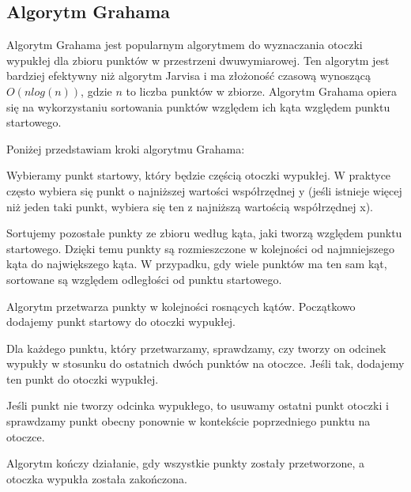 \subsection{Algorytm Grahama}

\quad Algorytm Grahama jest popularnym algorytmem do wyznaczania otoczki wypukłej dla zbioru punktów w przestrzeni dwuwymiarowej. Ten algorytm jest bardziej efektywny niż algorytm Jarvisa i ma złożoność czasową wynoszącą $O(nlog(n))$, gdzie $n$ to liczba punktów w zbiorze. Algorytm Grahama opiera się na wykorzystaniu sortowania punktów względem ich kąta względem punktu startowego.

Poniżej przedstawiam kroki algorytmu Grahama:

Wybieramy punkt startowy, który będzie częścią otoczki wypukłej. W praktyce często wybiera się punkt o najniższej wartości współrzędnej y (jeśli istnieje więcej niż jeden taki punkt, wybiera się ten z najniższą wartością współrzędnej x).

Sortujemy pozostałe punkty ze zbioru według kąta, jaki tworzą względem punktu startowego. Dzięki temu punkty są rozmieszczone w kolejności od najmniejszego kąta do największego kąta. W przypadku, gdy wiele punktów ma ten sam kąt, sortowane są względem odległości od punktu startowego.

Algorytm przetwarza punkty w kolejności rosnących kątów. Początkowo dodajemy punkt startowy do otoczki wypukłej.

Dla każdego punktu, który przetwarzamy, sprawdzamy, czy tworzy on odcinek wypukły w stosunku do ostatnich dwóch punktów na otoczce. Jeśli tak, dodajemy ten punkt do otoczki wypukłej.

Jeśli punkt nie tworzy odcinka wypukłego, to usuwamy ostatni punkt otoczki i sprawdzamy punkt obecny ponownie w kontekście poprzedniego punktu na otoczce.

Algorytm kończy działanie, gdy wszystkie punkty zostały przetworzone, a otoczka wypukła została zakończona.





